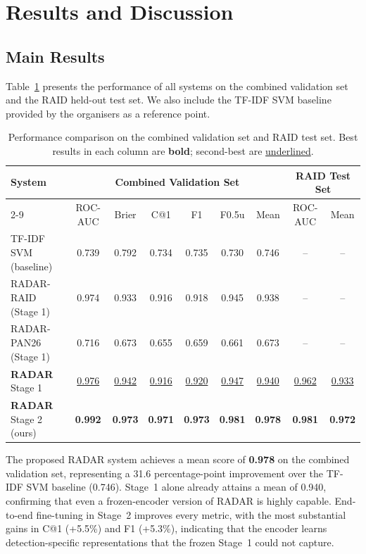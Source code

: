 
\section{Results and Discussion}
\label{sec:results}

\subsection{Main Results}

Table~\ref{tab:main_results} presents the performance of all systems on the combined validation set and the RAID held-out test set. We also include the TF-IDF SVM baseline provided by the organisers as a reference point.

\begin{table}[htbp]
  \centering
  \caption{Performance comparison on the combined validation set and RAID test set.
           Best results in each column are \textbf{bold}; second-best are \underline{underlined}.}
  \label{tab:main_results}
  \setlength{\tabcolsep}{6pt}
  \begin{tabular}{lcccccc|cc}
    \toprule
    \multirow{2}{*}{\textbf{System}} &
    \multicolumn{6}{c|}{\textbf{Combined Validation Set}} &
    \multicolumn{2}{c}{\textbf{RAID Test Set}} \\
    \cmidrule{2-9}
    & ROC-AUC & Brier & C@1 & F1 & F0.5u & Mean & ROC-AUC & Mean \\
    \midrule
    TF-IDF SVM (baseline)        & 0.739 & 0.792 & 0.734 & 0.735 & 0.730 & 0.746 & -- & -- \\
    RADAR-RAID (Stage 1)         & 0.974 & 0.933 & 0.916 & 0.918 & 0.945 & 0.938 & -- & -- \\
    RADAR-PAN26 (Stage 1)        & 0.716 & 0.673 & 0.655 & 0.659 & 0.661 & 0.673 & -- & -- \\
    \textbf{RADAR} Stage 1       & \underline{0.976} & \underline{0.942} & \underline{0.916} & \underline{0.920} & \underline{0.947} & \underline{0.940} & \underline{0.962} & \underline{0.933} \\
    \textbf{RADAR} Stage 2 (ours) & \textbf{0.992} & \textbf{0.973} & \textbf{0.971} & \textbf{0.973} & \textbf{0.981} & \textbf{0.978} & \textbf{0.981} & \textbf{0.972} \\
    \bottomrule
  \end{tabular}
\end{table}

The proposed RADAR system achieves a mean score of \textbf{0.978} on the combined validation set, representing a 31.6 percentage-point improvement over the TF-IDF SVM baseline (0.746). Stage~1 alone already attains a mean of 0.940, confirming that even a frozen-encoder version of RADAR is highly capable. End-to-end fine-tuning in Stage~2 improves every metric, with the most substantial gains in C@1 (+5.5\%) and F1 (+5.3\%), indicating that the encoder learns detection-specific representations that the frozen Stage~1 could not capture.

